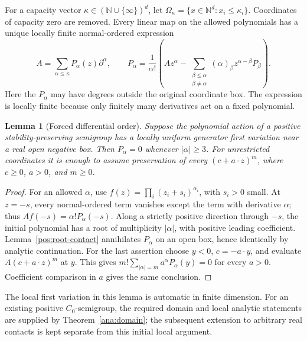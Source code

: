 \documentclass[reqno]{amsart}
\newtheorem{lemma}[theorem]{Lemma}
\theoremstyle{definition}
\theoremstyle{remark}
\newcommand{\N}{\mathbb N}
\begin{document}
For a capacity vector \(\kappa\in(\N\cup\{\infty\})^d\), let
\(\Omega_\kappa=\{x\in\N^d:x_i\le\kappa_i\}\).  Coordinates of capacity zero are
removed.  Every linear map on the allowed polynomials has a unique locally finite
normal-ordered expression
\begin{equation}\label{pos:normal-recursion}
 A=\sum_{\alpha\le\kappa}P_\alpha(z)\partial^\alpha,
 \qquad
 P_\alpha=\frac1{\alpha!}\left(Az^\alpha-
 \sum_{\substack{\beta\le\alpha\\\beta\ne\alpha}}
 (\alpha)_\beta z^{\alpha-\beta}P_\beta\right).
\end{equation}
Here the \(P_\alpha\) may have degrees outside the original coordinate box.
The expression is locally finite because only finitely many derivatives act on a
fixed polynomial.

\begin{lemma}[Forced differential order]\label{pos:order}
Suppose the polynomial action of a positive stability-preserving semigroup has a
locally uniform generator first variation near a real open negative box.
Then \(P_\alpha=0\) whenever \(|\alpha|\ge3\).
For unrestricted coordinates it is enough to assume preservation of every
\((c+a\cdot z)^m\), where \(c\ge0\), \(a>0\), and \(m\ge0\).
\end{lemma}
\begin{proof}
For an allowed \(\alpha\), use
\(f(z)=\prod_i(z_i+s_i)^{\alpha_i}\), with \(s_i>0\) small.
At \(z=-s\), every normal-ordered term vanishes except the term with derivative
\(\alpha\); thus \(Af(-s)=\alpha!P_\alpha(-s)\).
Along a strictly positive direction through \(-s\), the initial polynomial has a
root of multiplicity \(|\alpha|\), with positive leading coefficient.
Lemma~\ref{pos:root-contact} annihilates \(P_\alpha\) on an open box, hence
identically by analytic continuation.  For the last assertion choose \(y<0\),
\(c=-a\cdot y\), and evaluate \(A(c+a\cdot z)^m\) at \(y\).  This gives
\(m!\sum_{|\alpha|=m}a^\alpha P_\alpha(y)=0\) for every \(a>0\).
Coefficient comparison in \(a\) gives the same conclusion.
\end{proof}

The local first variation in this lemma is automatic in finite dimension.  For
an existing positive \(C_0\)-semigroup, the required domain and local analytic
statements are supplied by Theorem~\ref{ana:domain}; the subsequent extension
to arbitrary real contacts is kept separate from this initial local argument.
\end{document}
